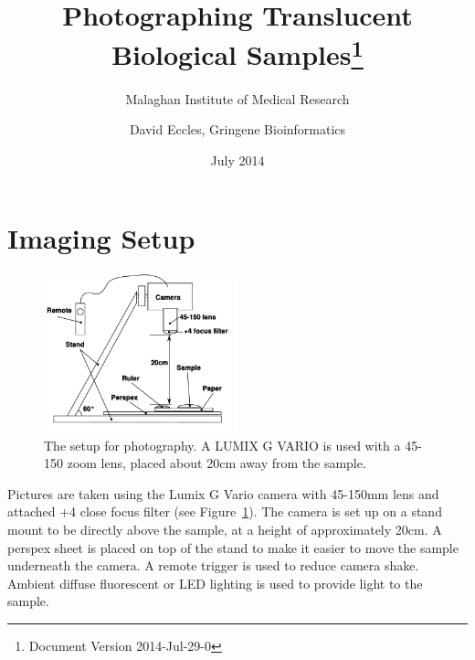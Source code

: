 \documentclass[a4paper]{scrartcl}
\begin{document}
\newcommand{\tabh}[1]{\multicolumn{1}{l}{\bfseries#1}} %



\setlength{\parindent}{0.0in}
\setlength{\parskip}{0.1in}


\pagestyle{fancy}
\fancyhead[L]{\thepage}
\fancyhead[R]{\leftmark}

\title{Photographing Translucent Biological Samples\footnote{Document Version 2014-Jul-29-0}}
\subtitle{Malaghan Institute of Medical Research}
\author{David Eccles, Gringene Bioinformatics}
\date{July 2014}
\maketitle


 {}
\tableofcontents{}
\clearpage


\section{Imaging Setup}

\begin{figure}
  \centering
  \includegraphics[width=0.5\textwidth]{illustrations/photography_setup.pdf}
  \caption{The setup for photography. A LUMIX G VARIO is used with a
    45-150 zoom lens, placed about 20cm away from the sample.}
  \label{fig:image-setup}
\end{figure}

Pictures are taken using the Lumix G Vario camera with 45-150mm lens
and attached +4 close focus filter (see
Figure~\ref{fig:image-setup}). The camera is set up on a stand mount
to be directly above the sample, at a height of approximately 20cm. A
perspex sheet is placed on top of the stand to make it easier to move
the sample underneath the camera. A remote trigger is used to reduce
camera shake. Ambient diffuse fluorescent or LED lighting is used to
provide light to the sample.
\end{document}
